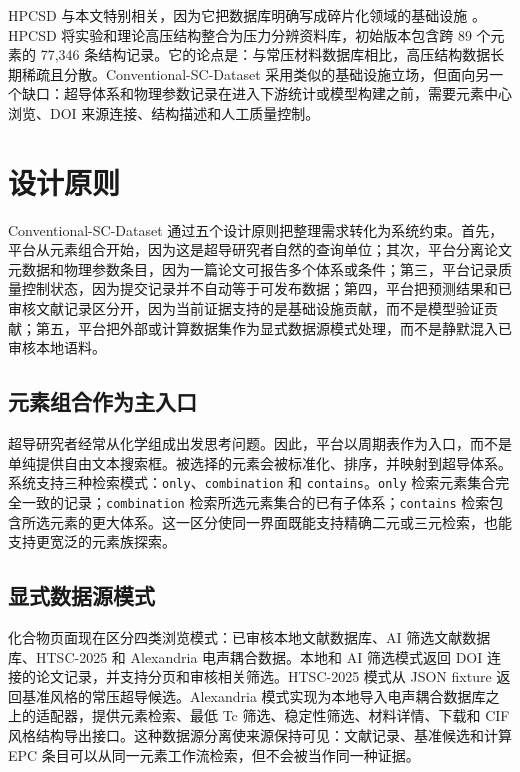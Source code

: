 \documentclass[11pt,a4paper]{ctexart}
\begin{document}
HPCSD 与本文特别相关，因为它把数据库明确写成碎片化领域的基础设施 \cite{wang2026hpcsd}。HPCSD 将实验和理论高压结构整合为压力分辨资料库，初始版本包含跨 89 个元素的 77,346 条结构记录。它的论点是：与常压材料数据库相比，高压结构数据长期稀疏且分散。Conventional-SC-Dataset 采用类似的基础设施立场，但面向另一个缺口：超导体系和物理参数记录在进入下游统计或模型构建之前，需要元素中心浏览、DOI 来源连接、结构描述和人工质量控制。

\section{设计原则}

Conventional-SC-Dataset 通过五个设计原则把整理需求转化为系统约束。首先，平台从元素组合开始，因为这是超导研究者自然的查询单位；其次，平台分离论文元数据和物理参数条目，因为一篇论文可报告多个体系或条件；第三，平台记录质量控制状态，因为提交记录并不自动等于可发布数据；第四，平台把预测结果和已审核文献记录区分开，因为当前证据支持的是基础设施贡献，而不是模型验证贡献；第五，平台把外部或计算数据集作为显式数据源模式处理，而不是静默混入已审核本地语料。

\subsection{元素组合作为主入口}

超导研究者经常从化学组成出发思考问题。因此，平台以周期表作为入口，而不是单纯提供自由文本搜索框。被选择的元素会被标准化、排序，并映射到超导体系。系统支持三种检索模式：\texttt{only}、\texttt{combination} 和 \texttt{contains}。\texttt{only} 检索元素集合完全一致的记录；\texttt{combination} 检索所选元素集合的已有子体系；\texttt{contains} 检索包含所选元素的更大体系。这一区分使同一界面既能支持精确二元或三元检索，也能支持更宽泛的元素族探索。

\subsection{显式数据源模式}

化合物页面现在区分四类浏览模式：已审核本地文献数据库、AI 筛选文献数据库、HTSC-2025 和 Alexandria 电声耦合数据。本地和 AI 筛选模式返回 DOI 连接的论文记录，并支持分页和审核相关筛选。HTSC-2025 模式从 JSON fixture 返回基准风格的常压超导候选。Alexandria 模式实现为本地导入电声耦合数据库之上的适配器，提供元素检索、最低 Tc 筛选、稳定性筛选、材料详情、下载和 CIF 风格结构导出接口。这种数据源分离使来源保持可见：文献记录、基准候选和计算 EPC 条目可以从同一元素工作流检索，但不会被当作同一种证据。
\end{document}
